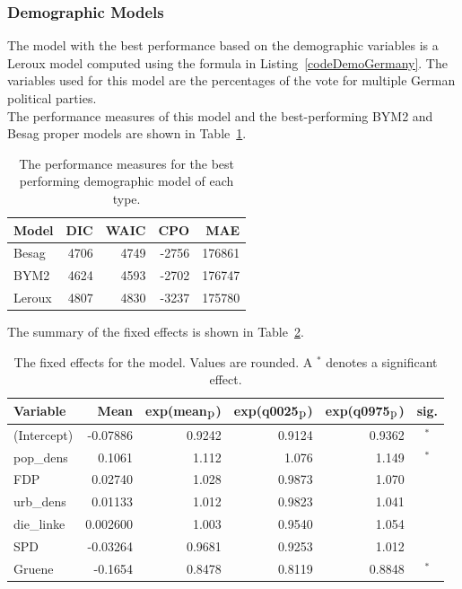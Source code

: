 \subsubsection{Demographic Models}\label{sssec:demoGermany}
The model with the best performance based on the demographic variables is a Leroux model computed using the formula in Listing~\ref{codeDemoGermany}. The variables used for this model are the percentages of the vote for multiple German political parties. \\
The performance measures of this model and the best-performing BYM2 and Besag proper models are shown in Table~\ref{demoGermany}. 
\begin{table}[H] 
\caption{The performance measures for the best performing demographic model of each type. \label{demoGermany}}
\begin{tabular}{l r r r r}
\toprule
\textbf{Model}	& \textbf{DIC}	& \textbf{WAIC} & \textbf{CPO} & \textbf{MAE}\\
\midrule
Besag  & 4706 & 4749 & -2756 &  176861 \\
BYM2 & 4624 & 4593  & -2702 &  176747\\
Leroux & 4807  & 4830 & -3237 & 175780\\
\bottomrule
\end{tabular}
\end{table}
The summary of the fixed effects is shown in Table~\ref{fixedDemoGermany_spatial}.
\begin{table}[H]
\caption{The fixed effects for the model. Values are rounded. A $^*$ denotes a significant effect. \label{fixedDemoGermany_spatial}}
\begin{tabular}{l r r r r c}
\toprule
\textbf{Variable}	& \textbf{Mean}	& \textbf{exp(mean$_{\hbox{p}}$)} & \textbf{exp(q0025$_{\hbox{p}}$)} & \textbf{exp(q0975$_{\hbox{p}}$)} & \textbf{sig.}\\
\midrule
(Intercept) & -0.07886 & 0.9242 & 0.9124 & 0.9362 & $^*$\\
pop\_dens & 0.1061 & 1.112 & 1.076 & 1.149 &$^*$\\
FDP & 0.02740 & 1.028 & 0.9873 & 1.070 &\\
urb\_dens & 0.01133 & 1.012 & 0.9823 & 1.041 &\\
die\_linke & 0.002600 & 1.003 & 0.9540 & 1.054 & \\
SPD & -0.03264 & 0.9681 & 0.9253 & 1.012 &\\
Gruene & -0.1654 & 0.8478 & 0.8119 & 0.8848 & $^*$\\
\bottomrule
\end{tabular}
\end{table}
